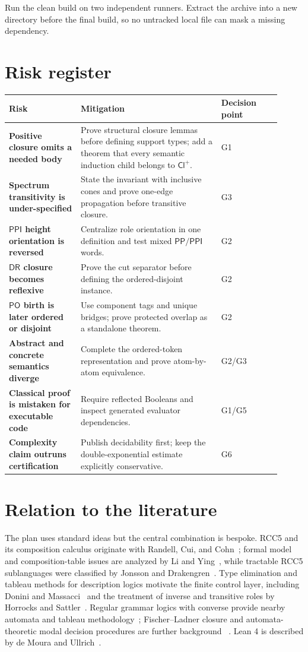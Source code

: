 \documentclass[11pt]{article}
\newcommand{\PP}{\mathsf{PP}}
\newcommand{\PPI}{\mathsf{PPI}}
\newcommand{\PO}{\mathsf{PO}}
\newcommand{\DR}{\mathsf{DR}}
\newcommand{\Cl}{\mathsf{Cl}^{+}}
\begin{document}
Run the clean build on two independent runners. Extract the archive into a new directory
before the final build, so no untracked local file can mask a missing dependency.

\section{Risk register}

\begin{longtable}{>{\bfseries}p{0.24\linewidth}p{0.47\linewidth}p{0.20\linewidth}}
\toprule
Risk & Mitigation & Decision point \\
\midrule
Positive closure omits a needed body &
Prove structural closure lemmas before defining support types; add a theorem that every
semantic induction child belongs to $\Cl$. & G1 \\
Spectrum transitivity is under-specified &
State the invariant with inclusive cones and prove one-edge propagation before
transitive closure. & G3 \\
$\PPI$ height orientation is reversed &
Centralize role orientation in one definition and test mixed $\PP/\PPI$ words. & G2 \\
$\DR$ closure becomes reflexive &
Prove the cut separator before defining the ordered-disjoint instance. & G2 \\
$\PO$ birth is later ordered or disjoint &
Use component tags and unique bridges; prove protected overlap as a standalone theorem. &
G2 \\
Abstract and concrete semantics diverge &
Complete the ordered-token representation and prove atom-by-atom equivalence. & G2/G3 \\
Classical proof is mistaken for executable code &
Require reflected Booleans and inspect generated evaluator dependencies. & G1/G5 \\
Complexity claim outruns certification &
Publish decidability first; keep the double-exponential estimate explicitly conservative. &
G6 \\
\bottomrule
\end{longtable}

\section{Relation to the literature}

The plan uses standard ideas but the central combination is bespoke. RCC5 and its
composition calculus originate with Randell, Cui, and Cohn~\cite{RCC92}; formal model and
composition-table issues are analyzed by Li and Ying~\cite{LiYing2003}, while tractable
RCC5 sublanguages were classified by Jonsson and Drakengren~\cite{JD1997}. Type
elimination and tableau methods for description logics motivate the finite control layer,
including Donini and Massacci~\cite{DM2000} and the treatment of inverse and transitive
roles by Horrocks and Sattler~\cite{HS1999}. Regular grammar logics with converse provide
nearby automata and tableau methodology~\cite{DN2005,Nguyen2007}; Fischer--Ladner closure
and automata-theoretic modal decision procedures are further background
~\cite{FL1979,VW1986}. Lean 4 is described by de Moura and Ullrich~\cite{Lean4}.
\end{document}
